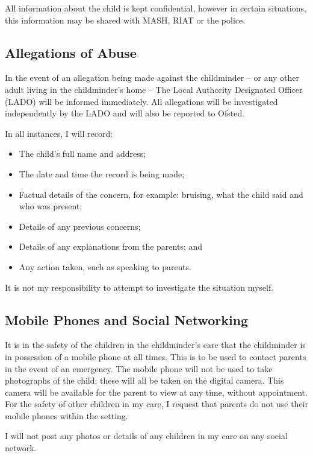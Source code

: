 All information about the child is kept confidential, however in certain
situations, this information may be shared with MASH, RIAT or the
police.

\subsection{Allegations of Abuse}

In the event of an allegation being made against the childminder -- or
any other adult living in the childminder's home -- The Local Authority
Designated Officer (LADO) will be informed immediately. All allegations
will be investigated independently by the LADO and will also be reported
to Ofsted.

In all instances, I will record:
\begin{itemize}[topsep=0pt]
\item
  The child's full name and address;
\item
  The date and time the record is being made;
\item
  Factual details of the concern, for example: bruising, what the
  child said and who was present;
\item
  Details of any previous concerns;
\item
  Details of any explanations from the parents; and
\item
  Any action taken, such as speaking to parents.
\end{itemize}

It is not my responsibility to attempt to investigate the situation
myself.

\subsection{Mobile Phones and Social Networking}

It is in the safety of the children in the childminder's care that the
childminder is in possession of a mobile phone at all times. This is to
be used to contact parents in the event of an emergency. The mobile
phone will not be used to take photographs of the child; these will all
be taken on the digital camera. This camera will be available for the
parent to view at any time, without appointment. For the safety of other
children in my care, I request that parents do not use their mobile
phones within the setting.

I will not post any photos or details of any children in my care on any
social network.

